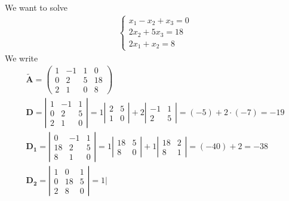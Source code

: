 \begin{myExample}
	We want to solve 
	\begin{eqnarray*}
			\begin{cases}
				x_1-x_2+x_3=0\\
				2x_2+5x_3=18\\
				2x_1+x_2=8
			\end{cases}
	\end{eqnarray*}
	We write
	\begin{eqnarray*}
		\mathbf{\tilde{A}}=
		\begin{pmatrix}
			1 & -1 & 1 & 0\\
			0 & 2 & 5 & 18\\
			2 & 1 & 0 & 8
		\end{pmatrix}
		\\
		\mathbf{D}=
		\left|
		\begin{matrix}
			1 & -1 & 1\\
			0 & 2 & 5\\
			2 & 1 & 0
		\end{matrix}
		\right|=
		1
		\left|
		\begin{matrix}
			2 & 5\\
			1 & 0
		\end{matrix}
		\right|
		+2
		\left|
		\begin{matrix}
			-1 & 1\\
			2 & 5
		\end{matrix}
		\right|=(-5)+2\cdot(-7)=-19
		\\
		\mathbf{D_1}=
		\left|
		\begin{matrix}
			0 & -1 & 1\\
			18 & 2 & 5\\
			8 & 1 & 0
		\end{matrix}
		\right|
		=
		1
		\left|
		\begin{matrix}
			18 & 5\\
			8& 0
		\end{matrix}
		\right|
		+1
		\left|
		\begin{matrix}
			18 & 2\\
			8 & 1
		\end{matrix}
		\right|=(-40)+2=-38
		\\
		\mathbf{D_2}=
		\left|
		\begin{matrix}
			1 & 0 & 1\\
			0 & 18 & 5\\
			2 & 8 & 0
		\end{matrix}
		\right|
		=
		1
		\left|
		\begin{matrix}

\end{matrix}
\end{eqnarray*}
\end{myExample}
